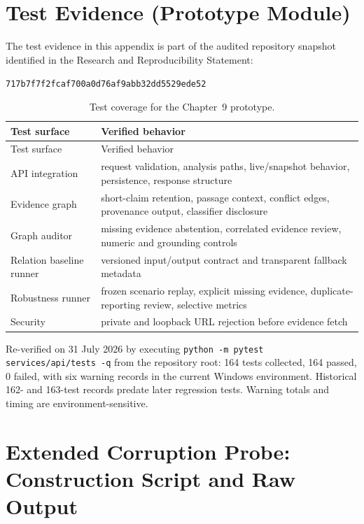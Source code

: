 \documentclass[12pt,a4paper,openany]{report}
\begin{document}
\chapter{Test Evidence (Prototype Module)}
The test evidence in this appendix is part of the audited repository snapshot
identified in the Research and Reproducibility Statement:
\begin{center}
\small\texttt{717b7f7f2fcaf700a0d76af9abb32dd5529ede52}
\end{center}
\begin{longtable}{p{4cm}p{10cm}}
\caption{Test coverage for the Chapter~9 prototype.}\\
\toprule Test surface & Verified behavior \\
\midrule
\endfirsthead
\toprule Test surface & Verified behavior \\
\midrule
\endhead
API integration & request validation, analysis paths, live/snapshot behavior, persistence, response structure \\
Evidence graph & short-claim retention, passage context, conflict edges, provenance output, classifier disclosure \\
Graph auditor & missing evidence abstention, correlated evidence review, numeric and grounding controls \\
Relation baseline runner & versioned input/output contract and transparent fallback metadata \\
Robustness runner & frozen scenario replay, explicit missing evidence, duplicate-reporting review, selective metrics \\
Security & private and loopback URL rejection before evidence fetch \\
\bottomrule
\end{longtable}
Re-verified on 31 July 2026 by executing \texttt{python -m pytest services/api/tests -q} from the repository root: 164 tests collected, 164 passed, 0 failed, with six warning records in the current Windows environment. Historical 162- and 163-test records predate later regression tests. Warning totals and timing are environment-sensitive.

\chapter{Extended Corruption Probe: Construction Script and Raw Output}
\end{document}

